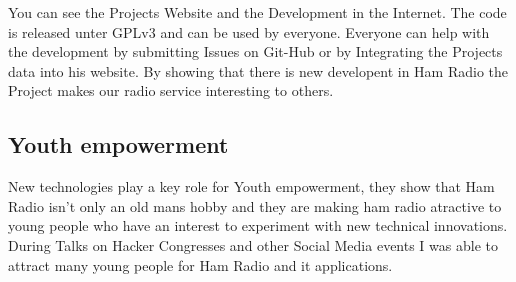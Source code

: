 \documentclass{article}
\begin{document}
You can see the Projects Website and the Development in the Internet. The 
code is released unter GPLv3 and can be used by everyone. Everyone can help 
with the development by submitting Issues on Git-Hub or by Integrating the 
Projects data into his website. By showing that there is new developent in Ham 
Radio the Project makes our radio service interesting to others.


\subsection{Youth empowerment}

New technologies play a key role for Youth empowerment, they show that Ham Radio 
isn't only an old mans hobby and they are making ham radio atractive to young people 
who have an interest to experiment with new technical innovations. During Talks on 
Hacker Congresses and other Social Media events I was able to attract many young 
people for Ham Radio and it applications. 
\end{document}
